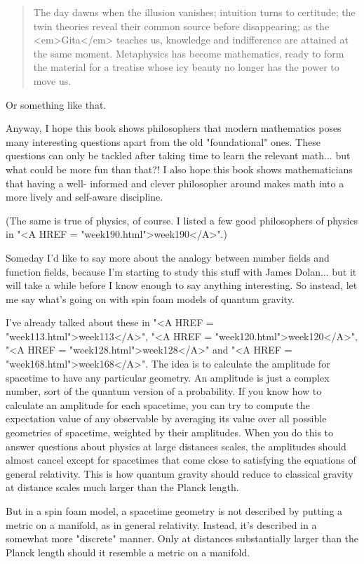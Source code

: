 \begin{quote}
     The day dawns when the illusion vanishes; intuition
     turns to certitude; the twin theories reveal their 
     common source before disappearing; as the <em>Gita</em> teaches 
     us, knowledge and indifference are attained at the same 
     moment.  Metaphysics has become mathematics, ready to
     form the material for a treatise whose icy beauty no
     longer has the power to move us.
\end{quote}
    
Or something like that.

Anyway, I hope this book shows philosophers that modern mathematics
poses many interesting questions apart from the old "foundational"
ones.  These questions can only be tackled after taking time to 
learn the relevant math... but what could be more fun than that?!  
I also hope this book shows mathematicians that having a well-
informed and clever philosopher around makes math into a more 
lively and self-aware discipline.

(The same is true of physics, of course.  I listed a few good 
philosophers of physics in "<A HREF = "week190.html">week190</A>".)  

Someday I'd like to say more about the analogy between number
fields and function fields, because I'm starting to study 
this stuff with James Dolan... but it will take a while 
before I know enough to say anything interesting.  So instead, 
let me say what's going on with spin foam models of quantum gravity.  

I've already talked about these 
in "<A HREF = "week113.html">week113</A>",
"<A HREF = "week120.html">week120</A>", 
"<A HREF = "week128.html">week128</A>" 
and "<A HREF = "week168.html">week168</A>".  
The idea is to calculate the amplitude for spacetime 
to have any particular geometry.  An amplitude is just a complex 
number, sort of the quantum version of a probability.  If you know 
how to calculate an amplitude for each spacetime, you can try to 
compute the expectation value of any observable by averaging its 
value over all possible geometries of spacetime, weighted by their 
amplitudes.   When you do this to answer questions about physics at 
large distances scales, the amplitudes should almost cancel except 
for spacetimes that come close to satisfying the equations of general 
relativity.  This is how quantum gravity should reduce to classical
gravity at distance scales much larger than the Planck length.

But in a spin foam model, a spacetime geometry is not described 
by putting a metric on a manifold, as in general relativity.  
Instead, it's described in a somewhat more "discrete" manner.  
Only at distances substantially larger than the Planck length 
should it resemble a metric on a manifold.

